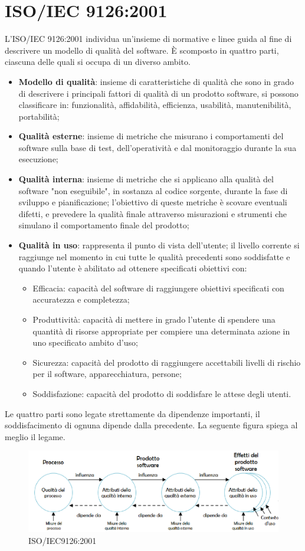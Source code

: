 \section{ISO/IEC 9126:2001}\label{ISO/IEC 9126Section}

L'ISO/IEC 9126:2001 individua un'insieme di normative e linee guida al fine di descrivere un modello di qualità del software. \`E scomposto in quattro parti, ciascuna delle quali si occupa di un diverso ambito. 
\begin{itemize}
	\item \textbf{Modello di qualità}: insieme di caratteristiche di qualità che sono in grado di descrivere i principali fattori di qualità di un prodotto software, si possono classificare in: funzionalità, affidabilità, efficienza, usabilità, manutenibilità, portabilità;
	\item \textbf{Qualità esterne}: insieme di metriche che misurano i comportamenti del software sulla base di test, dell'operatività e dal monitoraggio durante la sua esecuzione;
	\item \textbf{Qualità interna}: insieme di metriche che si applicano alla qualità del software "non eseguibile", in sostanza al codice sorgente, durante la fase di sviluppo e pianificazione; l'obiettivo di queste metriche è scovare eventuali difetti, e prevedere la qualità finale attraverso misurazioni e strumenti che simulano il comportamento finale del prodotto;
	\item \textbf{Qualità in uso}: rappresenta il punto di vista dell'utente; il livello corrente si raggiunge nel momento in cui tutte le qualità precedenti sono soddisfatte e quando l'utente è abilitato ad ottenere specificati obiettivi con:
	\begin{itemize}
		\item Efficacia: capacità del software di raggiungere obiettivi specificati con accuratezza e completezza;
		\item Produttività: capacità di mettere in grado l'utente di spendere una quantità di risorse appropriate per compiere una determinata azione in uno specificato ambito d'uso;
		\item Sicurezza: capacità del prodotto di raggiungere accettabili livelli di rischio per il software, apparecchiatura, persone;
		\item Soddisfazione: capacità del prodotto di soddisfare le attese degli utenti.
	\end{itemize}	
\end{itemize}
Le quattro parti sono legate strettamente da dipendenze importanti, il soddisfacimento di ognuna dipende dalla precedente. La seguente figura spiega al meglio il legame.

\begin{figure}[H]
\centering

	\includegraphics[width=0.9\linewidth]{./images/quality_cicle_iso9126.png} 
	\caption{ISO/IEC9126:2001}
	\label{ISO/IEC9126:2001}	

\end{figure}

 